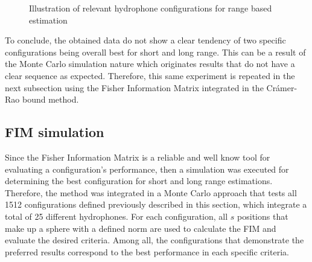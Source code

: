 \begin{figure}[!htb]
	\captionsetup{justification=centering,margin=2cm}
	\caption{Illustration of relevant hydrophone configurations for range based estimation}
	\label{fig:config-images}
\end{figure}

To conclude, the obtained data do not show a clear tendency of two specific configurations being overall best for short and long range. This can be a result of the Monte Carlo simulation nature which originates results that do not have a clear sequence as expected. Therefore, this same experiment is repeated in the next subsection using the Fisher Information Matrix integrated in the Crámer-Rao bound method.

\subsection{FIM simulation}

Since the Fisher Information Matrix is a reliable and well know tool for evaluating a configuration's performance, then a simulation was executed for determining the best configuration for short and long range estimations.
Therefore, the method was integrated in a Monte Carlo approach that tests all 1512 configurations defined previously described in this section, which integrate a total of 25 different hydrophones. For each configuration, all $s$ positions that make up a sphere with a defined norm are used to calculate the FIM and evaluate the desired criteria. Among all, the configurations that demonstrate the preferred results correspond to the best performance in each specific criteria.

